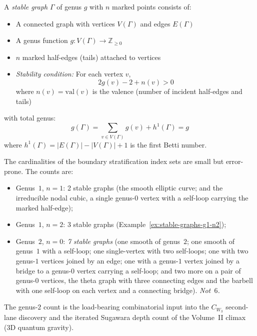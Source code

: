 \begin{definition}\label{def:stable-graph}
A \emph{stable graph} $\Gamma$ of genus $g$ with $n$ marked points consists of:
\begin{itemize}
\item A connected graph with vertices $V(\Gamma)$ and edges $E(\Gamma)$
\item A genus function $g: V(\Gamma) \to \mathbb{Z}_{\geq 0}$
\item $n$ marked half-edges (tails) attached to vertices
\item \emph{Stability condition:} For each vertex $v$,
\[2g(v) - 2 + n(v) > 0\]
where $n(v) = \text{val}(v)$ is the valence (number of incident half-edges and tails)
\end{itemize}
with total genus:
\[g(\Gamma) = \sum_{v \in V(\Gamma)} g(v) + h^1(\Gamma) = g\]
where $h^1(\Gamma) = |E(\Gamma)| - |V(\Gamma)| + 1$ is the first Betti number.
\end{definition}

\begin{remark}
\label{rem:stable-graph-counts-anchors}
The cardinalities of the boundary stratification index sets are
small but error-prone. The counts are:
\begin{itemize}
\item Genus~$1$, $n = 1$: 2 stable graphs (the smooth elliptic
curve; and the irreducible nodal cubic, a single genus-$0$ vertex
with a self-loop carrying the marked half-edge);
\item Genus~$1$, $n = 2$: 3 stable graphs (Example~\ref{ex:stable-graphs-g1-n2});
\item Genus~$2$, $n = 0$: \emph{7 stable graphs} (one smooth
of genus~$2$; one smooth of genus~$1$ with a self-loop; one
single-vertex with two self-loops; one with two genus-$1$
vertices joined by an edge; one with a genus-$1$ vertex joined by a
bridge to a genus-$0$ vertex carrying a self-loop; and two more on a
pair of genus-$0$ vertices, the theta graph with three connecting
edges and the barbell with one self-loop on each vertex and a
connecting bridge).
\emph{Not~$6$.}
\end{itemize}
The genus-$2$ count is the load-bearing combinatorial input
into the $C_{W_3}$ second-lane discovery and the iterated
Sugawara depth count of the Volume~II climax (3D quantum
gravity).
\end{remark}


